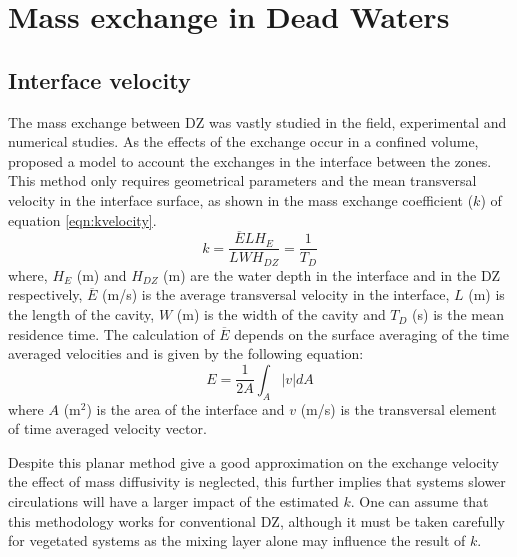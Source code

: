 \section{Mass exchange in Dead Waters}
\subsection{Interface velocity}
The mass exchange between DZ was vastly studied in the field, experimental and numerical studies. As the effects of the exchange occur in a confined volume, \textcite{weitbrecht2001} proposed a model to account the exchanges in the interface between the zones. This method only requires geometrical parameters and the mean transversal velocity in the interface surface, as shown in the mass exchange coefficient ($k$) of equation \ref{eqn:kvelocity}.
\begin{equation}
k=\frac{\overline{E}LH_E}{L WH_{DZ}}=\frac{1}{T_D}
\label{eqn:kvelocity}
\end{equation}
where, $H_E$ (m) and $H_{DZ}$ (m) are the water depth in the interface and in the DZ respectively, $\overline{E}$ (m/s) is the average transversal velocity in the interface, $L$ (m) is the length of the cavity, $W$ (m) is the width of the cavity and $T_D$ (s) is the mean residence time. The calculation of $\overline{E}$ depends on the surface averaging of the time averaged velocities and is given by the following equation:
\begin{equation}
E = \frac{1}{2A}\int_{A}^{}\left | v \right |dA
\label{eqn:exchangeVel}
 \end{equation}
 where $A$ (m$^2$) is the area of the interface and $v$ (m/s) is the transversal element of time averaged velocity vector.

Despite this planar method give a good approximation on the exchange velocity the effect of mass diffusivity is neglected, this further implies that systems slower circulations will have a larger impact of the estimated $k$. One can assume that this methodology works for conventional DZ, although it must be taken carefully for vegetated systems as the mixing layer alone may influence the result of $k$.
